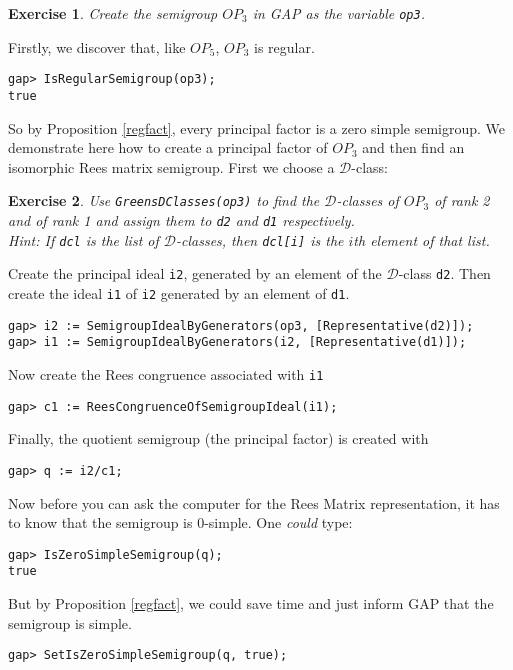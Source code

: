\documentclass[12pt]{article}
\theoremstyle{plain} \newtheorem{Thm}{Theorem}
\theoremstyle{plain} \newtheorem{Cor}{Corollary}
\theoremstyle{plain} \newtheorem{Lemma}{Lemma}
\theoremstyle{plain} \newtheorem{Prop}{Proposition}
\theoremstyle{plain} \newtheorem{Ex}{Exercise}
\def\gap{\sf GAP}
\def\d{${\mathcal{D}}$}
\begin{document}
\begin{Ex}
Create the semigroup $OP_3$ in {\gap} as the variable {\tt op3}.
\end{Ex}
Firstly, we discover that, like $OP_5$,  $OP_3$ is regular.
\begin{verbatim}
gap> IsRegularSemigroup(op3);
true
\end{verbatim}
So by Proposition \ref{regfact}, every principal factor is 
a zero simple semigroup.
We demonstrate here how to create a principal factor of
$OP_3$ and then find an isomorphic Rees matrix semigroup.
First we choose a \d-class:
\begin{Ex}
Use {\tt GreensDClasses(op3)} 
to find the \d-classes of $OP_3$
of rank 2 and of rank 1 and assign them to 
{\tt d2} and {\tt d1} respectively.\\
{\rm Hint: If {\tt dcl} is the list of \d-classes, then
{\tt dcl[i]} is the $i$th element of that list.}
\end{Ex}

Create the principal ideal {\tt i2}, generated by an element of
the \d-class {\tt d2}.
Then create the ideal {\tt i1}  of {\tt i2} generated by an element of
{\tt d1}.
\begin{verbatim}
gap> i2 := SemigroupIdealByGenerators(op3, [Representative(d2)]);
gap> i1 := SemigroupIdealByGenerators(i2, [Representative(d1)]);
\end{verbatim}

Now create the Rees congruence associated with {\tt i1}
\begin{verbatim}
gap> c1 := ReesCongruenceOfSemigroupIdeal(i1);
\end{verbatim}

Finally, the quotient semigroup (the principal factor) is created with
\begin{verbatim}
gap> q := i2/c1;

\end{verbatim}

Now before you can ask the computer for the Rees Matrix 
representation, it has to know that the semigroup is $0$-simple.
One {\em could} type:
\begin{verbatim}
gap> IsZeroSimpleSemigroup(q);
true
\end{verbatim}
But by Proposition \ref{regfact}, we could save time and just inform {\gap}
that the semigroup is simple.
\begin{verbatim}
gap> SetIsZeroSimpleSemigroup(q, true);
\end{verbatim}
\end{document}
